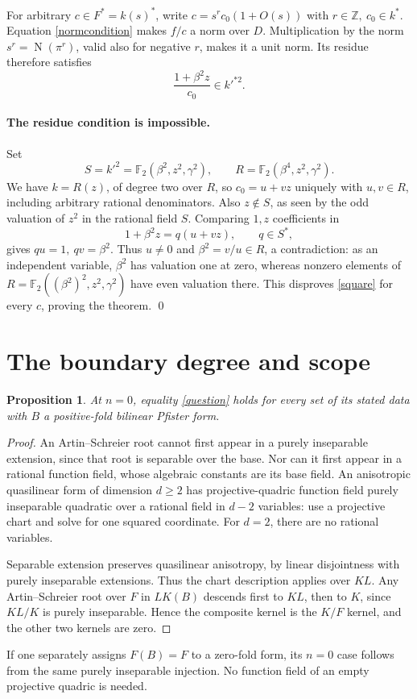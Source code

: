 \documentclass[11pt]{article}
\newtheorem{proposition}[theorem]{Proposition}
\newcommand{\F}{\mathbb F}
\newcommand{\N}{\operatorname{N}}
\begin{document}
For arbitrary \(c\in F^*=k(s)^*\), write
\(c=s^r c_0(1+O(s))\) with \(r\in\mathbb Z,\ c_0\in k^*\).
Equation \eqref{normcondition} makes \(f/c\) a norm over \(D\).
Multiplication by the norm \(s^r=\N(\pi^r)\), valid also for negative
\(r\), makes it a unit norm. Its residue therefore satisfies
\begin{equation}\label{square}
 \frac{1+\beta^2z}{c_0}\in k'^{*2}.
\end{equation}

\paragraph{The residue condition is impossible.}
Set
\[
 S=k'^2=\F_2(\beta^2,z^2,\gamma^2),\qquad
 R=\F_2(\beta^4,z^2,\gamma^2).
\]
We have \(k=R(z)\), of degree two over \(R\), so
\(c_0=u+vz\) uniquely with \(u,v\in R\), including arbitrary rational
denominators. Also \(z\notin S\), as seen by the odd valuation of
\(z^2\) in the rational field \(S\). Comparing \(1,z\) coefficients in
\[
 1+\beta^2z=q(u+vz),\qquad q\in S^*,
\]
gives \(qu=1,\ qv=\beta^2\). Thus \(u\ne0\) and
\(\beta^2=v/u\in R\), a contradiction: as an independent variable,
\(\beta^2\) has valuation one at zero, whereas nonzero elements of
\(R=\F_2((\beta^2)^2,z^2,\gamma^2)\) have even valuation there.
This disproves \eqref{square} for every \(c\), proving the theorem.
\qed

\section{The boundary degree and scope}
\begin{proposition}
At \(n=0\), equality \eqref{question} holds for every set of its stated
data with \(B\) a positive-fold bilinear Pfister form.
\end{proposition}
\begin{proof}
An Artin--Schreier root cannot first appear in a purely inseparable
extension, since that root is separable over the base. Nor can it first
appear in a rational function field, whose algebraic constants are its
base field. An anisotropic quasilinear form of dimension \(d\ge2\) has
projective-quadric function field purely inseparable
quadratic over a rational field in \(d-2\) variables: use a projective
chart and solve for one squared coordinate. For \(d=2\), there are no
rational variables.

Separable extension preserves quasilinear anisotropy, by linear
disjointness with purely inseparable extensions. Thus the chart
description applies over \(KL\). Any Artin--Schreier root over \(F\)
in \(LK(B)\) descends first to \(KL\), then to \(K\), since \(KL/K\)
is purely inseparable. Hence the composite kernel is the \(K/F\)
kernel, and the other two kernels are zero.
\end{proof}
If one separately assigns \(F(B)=F\) to a zero-fold form, its
\(n=0\) case follows from the same purely inseparable injection.
No function field of an empty projective quadric is needed.
\end{document}
